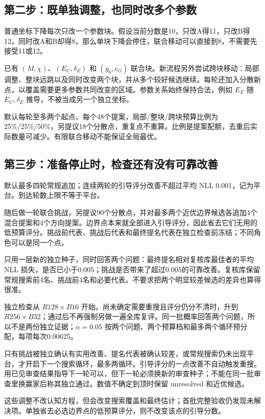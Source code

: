 \documentclass[11pt]{article}
\begin{document}
\subsection{第二步：既单独调整，也同时改多个参数}
普通坐标下降每次只改一个参数块。假设当前分数是10，只改A得11，只改B得12，同时改A和B却得8，那么单块下降会停住，联合移动可以直接到8，不需要先接受11或12。

已有 $(M,\chi)$、$(E_C,\delta_E)$ 和 $(g_0,c_G)$ 联合块。新流程另外尝试跨块移动：局部调整、整块远跳以及同时改变两个块，并从多个较好候选继续。每轮还加入分散新点，以覆盖需要更多参数共同改变的区域。参数关系始终保持合法，例如 $E_E$ 随 $E_C,\delta_E$ 推导，不被当成另一个独立坐标。

默认每轮至多两个起点、每个48个提案，局部/整块/跨块预算比例为25\%/25\%/50\%，另提议18个分散点，重复点不重算。比例是提案配额，去重后实际数量可减少。有限联合移动不能保证全局最优。

\subsection{第三步：准备停止时，检查还有没有可靠改善}
默认最多四轮常规追加；连续两轮的引导评分改善不超过平均 NLL 0.001，记为平台。到达轮数上限不等于平台。

随后做一轮联合挑战，另提议90个分散点，并对最多两个近优边界候选各追加4个混合提案和4个方向提案。边界点本来就全部进入引导评分，因此省去它们无用的低预算评分。挑战前代表、挑战后代表和最终提名代表在独立检查前冻结；不同角色可以是同一个点。

只用一层新的独立种子，同时回答两个问题：最终提名相对复核库最佳者的平均 NLL 损失，是否已小于0.005；挑战是否带来了超过0.005的可靠改善。复核库保留常规搜索前4名、挑战前4名和必要代表。不要求把两个明显较差候选的差异也算得很准。

独立检查从 $R128\times B16$ 开始。尚未确定需要重搜且评分仍分不清时，升到 $R256\times B32$；通过后不再强制另做一遍全库复评。同一批概率回答两个问题，所以不是两份独立证据；$\alpha=0.05$ 按两个问题、两个预算档和最多两个循环预分配，每项每次0.00625。

只有挑战被独立确认有实用改善、提名代表被确认较差，或常规搜索仍未出现平台，才开启下一个搜索循环，最多两循环。引导评分的一点改善不自动触发重搜。用已见审查结果指导下一轮可以，但下一轮必须换新的审查种子；不能在同一批审查里换赢家后称其独立通过。数值不确定到顶时保留 unresolved 和近优候选。

这些调整不改认知方程，但会改变搜索覆盖和最终估计；首批完整验收仍发现未解决项。单独省去必选边界点的低预算评分，则不改变该点的引导分数。
\end{document}
